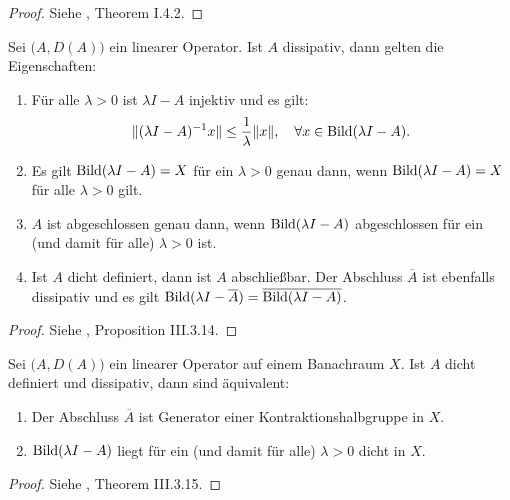 \begin{proof}
Siehe \cite{pazy_1983}, Theorem I.4.2.
\end{proof}

\begin{prop}\label{Eigenschaften Dissipativer Operatoren}
Sei $\big(A, D(A)\big)$ ein linearer Operator. Ist $A$ dissipativ, dann gelten die Eigenschaften:
\begin{enumerate}
\item Für alle $\lambda >0$ ist $\lambda I- A$ injektiv und es gilt:
\begin{equation*}
    \|(\lambda I- A)^{-1}x\|\leq\frac{1}{\lambda}\|x\|,\quad\forall x\in\textnormal{Bild}(\lambda I- A).
\end{equation*}
\item Es gilt $\textnormal{Bild}(\lambda I- A)=X$ für ein $\lambda >0$ genau dann, wenn $\textnormal{Bild}(\lambda I- A)=X$ für alle $\lambda >0$ gilt.
\item $A$ ist abgeschlossen genau dann, wenn $\textnormal{Bild}(\lambda I-A)$ abgeschlossen für ein (und damit für alle) $\lambda >0$ ist.
\item Ist $A$ dicht definiert, dann ist $A$ abschließbar. Der Abschluss $\overline{A}$ ist ebenfalls dissipativ und es gilt $\textnormal{Bild}(\lambda I- \overline{A})=\overline{\textnormal{Bild}(\lambda I-A)}$.
\end{enumerate}
\end{prop}

\begin{proof}
Siehe \cite{engel_nagel_2006}, Proposition III.3.14.
\end{proof}

\begin{satz}\label{Lumer-Phillips}
Sei $\big(A, D(A)\big)$ ein linearer Operator auf einem Banachraum $X$. Ist $A$ dicht definiert und dissipativ, dann sind äquivalent:
\begin{enumerate}
\item Der Abschluss $\overline{A}$ ist Generator einer Kontraktionshalbgruppe in $X$.
\item $\textnormal{Bild}(\lambda I- A)$ liegt für ein (und damit für alle) $\lambda>0$ dicht in $X$.
\end{enumerate}
\end{satz}

\begin{proof}
Siehe  \cite{engel_nagel_2006}, Theorem III.3.15.
\end{proof}

